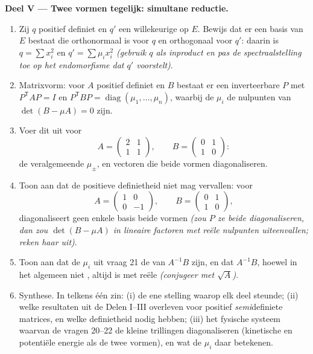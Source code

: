 \begin{problem}
\medskip
\noindent\textbf{Deel V --- Twee vormen tegelijk: simultane
reductie.}
\begin{enumerate}[resume]
  \item Zij $q$ positief definiet en $q'$ een willekeurige
         op $E$. Bewijs dat er een basis van $E$
        bestaat die orthonormaal is voor $q$ en orthogonaal voor
        $q'$: daarin is $q = \sum x_i^2$ en $q' = \sum \mu_i
        x_i^2$ \emph{(gebruik $q$ als inproduct en pas de
        spectraalstelling toe op het endomorfisme dat $q'$
        voorstelt)}.
  \item Matrixvorm: voor $A$ positief definiet en $B$ 
        bestaat er een inverteerbare $P$ met $P^{\mathsf T}AP = I$
        en $P^{\mathsf T}BP = \operatorname{diag}(\mu_1, \dots,
        \mu_n)$, waarbij de $\mu_i$ de nulpunten van $\det(B - \mu
        A) = 0$ zijn.
  \item Voer dit  uit voor
        \[
        A = \begin{pmatrix} 2 & 1\\ 1 & 1 \end{pmatrix},
        \qquad
        B = \begin{pmatrix} 0 & 1\\ 1 & 0 \end{pmatrix} :
        \]
        de veralgemeende  $\mu_\pm$, en vectoren die
        beide vormen diagonaliseren.
  \item Toon aan dat de positieve definietheid niet mag vervallen:
        voor
        \[
        A = \begin{pmatrix} 1 & 0\\ 0 & -1 \end{pmatrix},
        \qquad
        B = \begin{pmatrix} 0 & 1\\ 1 & 0 \end{pmatrix},
        \]
        diagonaliseert geen enkele basis beide vormen \emph{(zou
        $P$ ze beide diagonaliseren, dan zou $\det(B - \mu A)$ in
        lineaire factoren met reële nulpunten uiteenvallen; reken
        haar uit)}.
  \item Toon aan dat de $\mu_i$ uit vraag 21 de  van
        $A^{-1}B$ zijn, en dat $A^{-1}B$, hoewel in het algemeen
        niet , altijd  is met reële
         \emph{(conjugeer met $\sqrt A$)}.
  \item Synthese. In telkens één zin: (i) de ene stelling waarop
        elk deel steunde; (ii) welke resultaten uit de Delen
        I--III overleven voor positief \emph{semi}definiete
        matrices, en welke definietheid nodig hebben; (iii) het
        fysische systeem waarvan de vragen 20--22 de kleine
        trillingen diagonaliseren (kinetische en potentiële energie
        als de twee vormen), en wat de $\mu_i$ daar betekenen.
\end{enumerate}
\end{problem}
